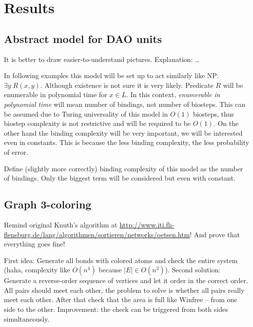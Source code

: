 \chapter{Results}

\section{Abstract model for DAO units}

It is better to draw easier-to-understand pictures. Explanation: \ldots

In following examples this model will be set up to act similarly like NP: $\exists y \; R(x,y)$. Although existence is not sure it is very likely. Predicate $R$ will be enumerable in polynomial time for $x \in L$. In this context, {\em enumerable in polynomial time} will mean number of bindings, not number of biosteps. This can be assumed due to Turing universality of this model in $O(1)$ biosteps, thus biostep complexity is not restrictive and will be required to be $O(1)$. On the other hand the binding complexity will be very important, we will be interested even in constants. This is because the less binding complexity, the less probability of error.

Define (slightly more correctly) binding complexity of this model as the number of bindings. Only the biggest term will be considered but even with constant.


\section{Graph 3-coloring}

Remind original Knuth's algorithm at \url{http://www.iti.fh-flensburg.de/lang/algorithmen/sortieren/networks/oetsen.htm}! And prove that everything goes fine!

First idea: Generate all bonds with colored atoms and check the entire system (haha, complexity like $O(n^4)$ because $|E| \in O(n^2) $). Second solution: Generate a reverse-order sequence of vertices and let it order in the correct order. All pairs should meet each other, the problem to solve is whether all pairs really meet each other. After that check that the area is full like Winfree -- from one side to the other. Improvement: the check can be triggered from both sides simultaneously.

